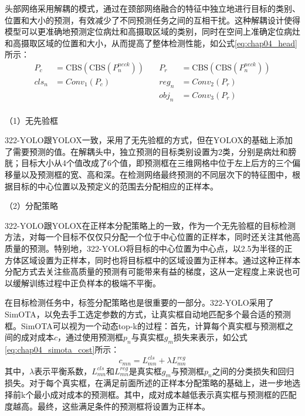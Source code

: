 头部网络采用解耦的模式，通过在颈部网络融合的特征中独立地进行目标的类别、位置和大小的预测，有效减少了不同预测任务之间的互相干扰。这种解耦设计使得模型可以更准确地预测定位病灶和高摄取区域的类别，同时在空间上准确定位病灶和高摄取区域的位置和大小，从而提高了整体检测性能，如公式\ref{eq:chap04_head}所示：
\begin{equation}
  \begin{aligned}
    P_c   & = \text{CBS}(\text{CBS}(P_n^{neck})) & \quad P_r   & = \text{CBS}(\text{CBS}(P_n^{neck})) \\
    cls_n & = Conv_1(P_c)                        & \quad reg_n & = Conv_2(P_r)                        \\
          &                                      & \quad obj_n & = Conv_3(P_r)                        \\
  \end{aligned}
  \label{eq:chap04_head}
\end{equation}

（1）无先验框

322-YOLO跟YOLOX一致，采用了无先验框的方式，但在YOLOX的基础上添加了需要预测的值。在解耦头中，独立预测的目标类别设置为2类，分别是病灶和膀胱；目标大小从4个值改成了6个值，即预测框在三维网格中位于左上后方的三个偏移量以及预测框的宽、高和深。在检测网络最终预测的不同层次下的特征图中，根据目标的中心位置以及预定义的范围去分配相应的正样本。

（2）分配策略

322-YOLO跟YOLOX在正样本分配策略上的一致，作为一个无先验框的目标检测方法，对每一个目标不仅仅只分配一个位于中心位置的正样本，同时还关注其他高质量的预测。特别地，322-YOLO将目标的中心位置为中心点，以2.5为半径的正方体区域设置为正样本，同时也将目标框中的区域设置为正样本。通过这种正样本分配方式去关注些高质量的预测有可能带来有益的梯度，这从一定程度上来说也可以缓解训练过程中正负样本的极端不平衡。

在目标检测任务中，标签分配策略也是很重要的一部分。322-YOLO采用了SimOTA\cite{ge2021yolox}，以免去手工选定参数的方式，让真实框自动地匹配多个最合适的预测框。SimOTA可以视为一个动态top-k的过程：首先，计算每个真实框与预测框之间的成对成本\(c\)，通过使用预测框\(p_n\)与真实框\(g_m\)损失来表示，如公式\ref{eq:chap04_simota_cost}所示：
\begin{equation}
  c_{mn} = L^{cls}_{mn} + \lambda L^{reg}_{mn}
  \label{eq:chap04_simota_cost}
\end{equation}
其中，\(\lambda\)表示平衡系数，\(L^{cls}_{mn}\)和\(L^{reg}_{mn}\)是真实框\(g_m\)与预测框\(p_n\)之间的分类损失和回归损失。对于每个真实框，在满足前面所述的正样本分配策略的基础上，进一步地选择前k个最小成对成本的预测框。其中，成对成本越低表示真实框与预测框的匹配度越高。最终，这些满足条件的预测框将设置为正样本。

